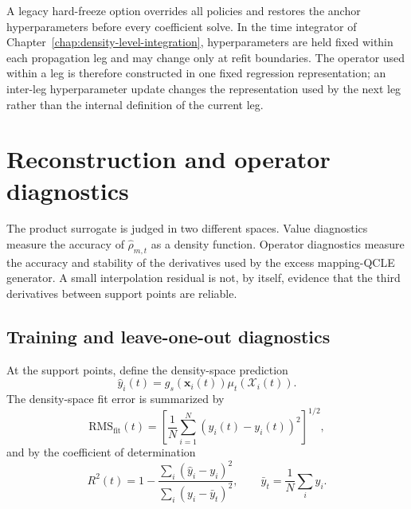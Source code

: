 \documentclass[
  11pt,
  letterpaper,
  onehalfspacing,
  normalmargins,
  equalmargins,
  oneside
]{ut-thesis}
\begin{document}
A legacy hard-freeze option overrides all policies and restores the anchor
hyperparameters before every coefficient solve. In the time integrator of
Chapter~\ref{chap:density-level-integration}, hyperparameters are held fixed
within each propagation leg and may change only at refit boundaries. The
operator used within a leg is therefore constructed in one fixed regression
representation; an inter-leg hyperparameter update changes the representation
used by the next leg rather than the internal definition of the current leg.


\section{Reconstruction and operator diagnostics}
\label{sec:moment-constraints-reconstruction-diagnostics}

The product surrogate is judged in two different spaces. Value diagnostics
measure the accuracy of
\(\widehat{\rho}_{m,t}\) as a density function. Operator
diagnostics measure the accuracy and stability of the derivatives used by the
excess mapping-QCLE generator. A small interpolation residual is not, by
itself, evidence that the third derivatives between support points are
reliable.


\subsection{Training and leave-one-out diagnostics}
\label{subsec:density-reconstruction-diagnostics}

At the support points, define the density-space prediction
\begin{equation}
\widehat y_i(t)
=
 g_s(\mathbf x_i(t))
\mu_t\!\left(\boldsymbol{\mathcal X}_i(t)\right).
\label{eq:gp-density-space-prediction}
\end{equation}
The density-space fit error is summarized by
\begin{equation}
\mathrm{RMS}_{\mathrm{fit}}(t)
=
\left[
\frac{1}{N}
\sum_{i=1}^{N}
\left(
\widehat y_i(t)-y_i(t)
\right)^2
\right]^{1/2},
\label{eq:gp-density-fit-rms}
\end{equation}
and by the coefficient of determination
\begin{equation}
R^2(t)
=
1-
\frac{
\sum_i\left(\widehat y_i-y_i\right)^2
}{
\sum_i\left(y_i-\bar y_t\right)^2
},
\qquad
\bar y_t
=
\frac{1}{N}\sum_i y_i.
\label{eq:gp-density-fit-r2}
\end{equation}
\end{document}

